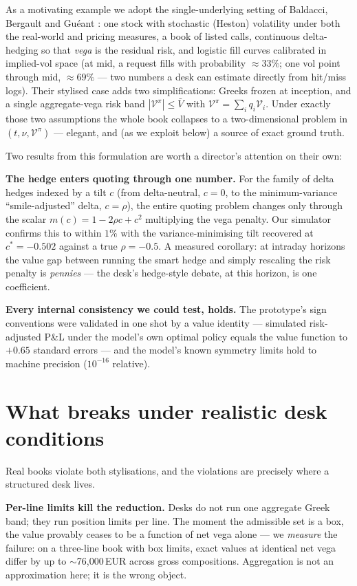 \documentclass[11pt,a4paper]{article}
\newcommand{\Vpi}{\mathcal{V}^{\pi}}
\begin{document}
As a motivating example we adopt the single-underlying setting of
Baldacci, Bergault and Gu\'eant \cite{bbg}: one stock with stochastic
(Heston) volatility under both the real-world and pricing measures, a book
of listed calls, continuous delta-hedging so that \emph{vega} is the
residual risk, and logistic fill curves calibrated in implied-vol space
(at mid, a request fills with probability $\approx 33\%$; one vol point
through mid, $\approx 69\%$ --- two numbers a desk can estimate directly
from hit/miss logs). Their stylised case adds two simplifications: Greeks
frozen at inception, and a single aggregate-vega risk band
$|\Vpi|\le\bar V$ with $\Vpi=\sum_i q_i\mathcal V_i$. Under exactly those
two assumptions the whole book collapses to a two-dimensional problem in
$(t,\nu,\Vpi)$ --- elegant, and (as we exploit below) a source of exact
ground truth.

Two results from this formulation are worth a director's attention on
their own:

\textbf{The hedge enters quoting through one number.} For the family of
delta hedges indexed by a tilt $c$ (from delta-neutral, $c=0$, to the
minimum-variance ``smile-adjusted'' delta, $c=\rho$), the entire quoting
problem changes only through the scalar $m(c)=1-2\rho c+c^2$ multiplying
the vega penalty. Our simulator confirms this to within $1\%$ with the
variance-minimising tilt recovered at $c^*=-0.502$ against a true
$\rho=-0.5$. A measured corollary: at intraday horizons the value gap
between running the smart hedge and simply rescaling the risk penalty is
\emph{pennies} --- the desk's hedge-style debate, at this horizon, is one
coefficient.

\textbf{Every internal consistency we could test, holds.} The prototype's
sign conventions were validated in one shot by a value identity ---
simulated risk-adjusted P\&L under the model's own optimal policy equals
the value function to $+0.65$ standard errors --- and the model's known
symmetry limits hold to machine precision ($10^{-16}$ relative).

\section{What breaks under realistic desk conditions}

Real books violate both stylisations, and the violations are precisely
where a structured desk lives.

\textbf{Per-line limits kill the reduction.} Desks do not run one
aggregate Greek band; they run position limits per line. The moment the
admissible set is a box, the value provably ceases to be a function of net
vega alone --- we \emph{measure} the failure: on a three-line book with
box limits, exact values at identical net vega differ by up to
$\sim$76{,}000\,EUR across gross compositions. Aggregation is not an
approximation here; it is the wrong object.
\end{document}
